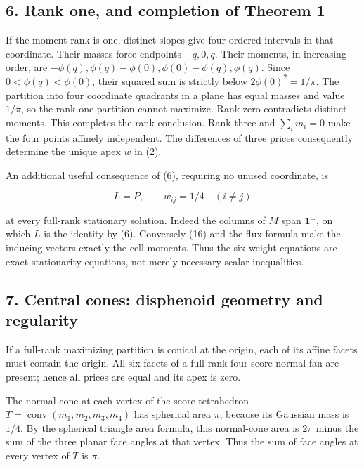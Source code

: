 \documentclass[
  11pt,
]{article}
\begin{document}
\subsection{6. Rank one, and completion of Theorem
1}\label{rank-one-and-completion-of-theorem-1}

If the moment rank is one, distinct slopes give four ordered intervals
in that coordinate. Their masses force endpoints \(-q,0,q\). Their
moments, in increasing order, are
\(-\phi(q),\phi(q)-\phi(0),\phi(0)-\phi(q),\phi(q)\). Since
\(0<\phi(q)<\phi(0)\), their squared sum is strictly below
\(2\phi(0)^2=1/\pi\). The partition into four coordinate quadrants in a
plane has equal masses and value \(1/\pi\), so the rank-one partition
cannot maximize. Rank zero contradicts distinct moments. This completes
the rank conclusion. Rank three and \(\sum_i m_i=0\) make the four
points affinely independent. The differences of three prices
consequently determine the unique apex \(w\) in (2).

An additional useful consequence of (6), requiring no unused coordinate,
is

\[
 L=P,\qquad w_{ij}=1/4\quad(i\ne j)                      \tag{16}
\]

at every full-rank stationary solution. Indeed the columns of \(M\) span
\(\mathbf1^\perp\), on which \(L\) is the identity by (6). Conversely
(16) and the flux formula make the inducing vectors exactly the cell
moments. Thus the six weight equations are exact stationarity equations,
not merely necessary scalar inequalities.

\subsection{7. Central cones: disphenoid geometry and
regularity}\label{central-cones-disphenoid-geometry-and-regularity}

If a full-rank maximizing partition is conical at the origin, each of
its affine facets must contain the origin. All six facets of a full-rank
four-score normal fan are present; hence all prices are equal and its
apex is zero.

The normal cone at each vertex of the score tetrahedron
\(T=\operatorname{conv}(m_1,m_2,m_3,m_4)\) has spherical area \(\pi\),
because its Gaussian mass is \(1/4\). By the spherical triangle area
formula, this normal-cone area is \(2\pi\) minus the sum of the three
planar face angles at that vertex. Thus the sum of face angles at every
vertex of \(T\) is \(\pi\).
\end{document}
